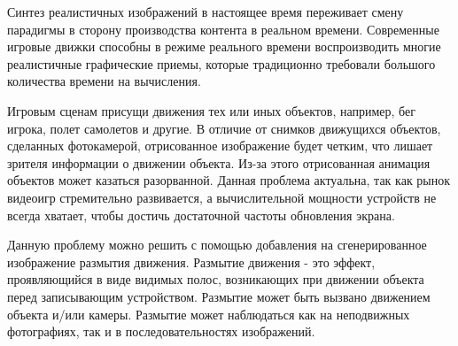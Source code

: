 \Introduction
Синтез реалистичных изображений в настоящее время переживает смену парадигмы в сторону производства контента в реальном времени. Современные игровые движки способны в режиме реального времени воспроизводить многие реалистичные графические приемы, которые традиционно требовали большого количества времени на вычисления. \cite{RONNOW202136}
\par
Игровым сценам присущи движения тех или иных объектов, например, бег игрока, полет самолетов и другие. В отличие от снимков движущихся объектов, сделанных фотокамерой, отрисованное изображение будет четким, что лишает зрителя информации о движении объекта. Из-за этого отрисованная анимация объектов может казаться разорванной. \cite{Navarro11} Данная проблема актуальна, так как рынок видеоигр стремительно развивается, а вычислительной мощности устройств не всегда хватает, чтобы достичь достаточной частоты обновления экрана.
\par
Данную проблему можно решить с помощью добавления на сгенерированное изображение размытия движения. Размытие движения - это эффект, проявляющийся в виде видимых полос, возникающих при движении объекта перед записывающим устройством. Размытие может быть вызвано движением объекта и/или камеры.  Размытие может наблюдаться как на неподвижных фотографиях, так и в последовательностях изображений. \cite{Navarro11}

